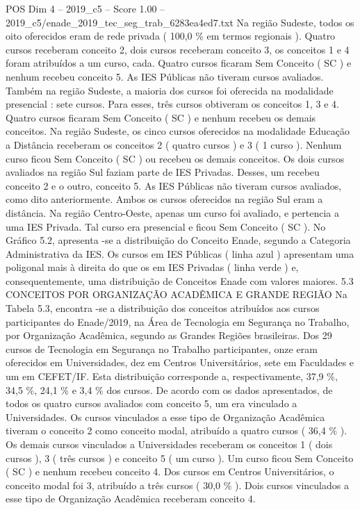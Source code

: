 \begin{textsample}{POS Dim 4 – 2019\_c5 – Score 1.00 – 2019\_c5/enade\_2019\_tec\_seg\_trab\_6283ea4ed7.txt}
Na região Sudeste, todos os oito oferecidos eram de rede privada ( 100,0 \% em termos regionais ).
Quatro cursos receberam conceito 2, dois cursos receberam conceito 3, os conceitos 1 e 4 foram atribuídos a um curso, cada.
Quatro cursos ficaram Sem Conceito ( SC ) e nenhum recebeu conceito 5.
As IES Públicas não tiveram cursos avaliados.
Também na região Sudeste, a maioria dos cursos foi oferecida na modalidade presencial : sete cursos.
Para esses, três cursos obtiveram os conceitos 1, 3 e 4.
Quatro cursos ficaram Sem Conceito ( SC ) e nenhum recebeu os demais conceitos.
Na região Sudeste, os cinco cursos oferecidos na modalidade Educação a Distância receberam os conceitos 2 ( quatro cursos ) e 3 ( 1 curso ).
Nenhum curso ficou Sem Conceito ( SC ) ou recebeu os demais conceitos.
Os dois cursos avaliados na região Sul faziam parte de IES Privadas.
Desses, um recebeu conceito 2 e o outro, conceito 5.
As IES Públicas não tiveram cursos avaliados, como dito anteriormente.
Ambos os cursos oferecidos na região Sul eram a distância.
Na região Centro-Oeste, apenas um curso foi avaliado, e pertencia a uma IES Privada.
Tal curso era presencial e ficou Sem Conceito ( SC ).
No Gráfico 5.2, apresenta -se a distribuição do Conceito Enade, segundo a Categoria Administrativa da IES.
Os cursos em IES Públicas ( linha azul ) apresentam uma poligonal mais à direita do que os em IES Privadas ( linha verde ) e, consequentemente, uma distribuição de Conceitos Enade com valores maiores. 5.3 CONCEITOS POR ORGANIZAÇÃO ACADÊMICA E GRANDE REGIÃO Na Tabela 5.3, encontra -se a distribuição dos conceitos atribuídos aos cursos participantes do Enade/2019, na Área de Tecnologia em Segurança no Trabalho, por Organização Acadêmica, segundo as Grandes Regiões brasileiras.
Dos 29 cursos de Tecnologia em Segurança no Trabalho participantes, onze eram oferecidos em Universidades, dez em Centros Universitários, sete em Faculdades e um em CEFET/IF.
Esta distribuição corresponde a, respectivamente, 37,9 \%, 34,5 \%, 24,1 \% e 3,4 \% dos cursos.
De acordo com os dados apresentados, de todos os quatro cursos avaliados com conceito 5, um era vinculado a Universidades.
Os cursos vinculados a esse tipo de Organização Acadêmica tiveram o conceito 2 como conceito modal, atribuído a quatro cursos ( 36,4 \% ).
Os demais cursos vinculados a Universidades receberam os conceitos 1 ( dois cursos ), 3 ( três cursos ) e conceito 5 ( um curso ).
Um curso ficou Sem Conceito ( SC ) e nenhum recebeu conceito 4.
Dos cursos em Centros Universitários, o conceito modal foi 3, atribuído a três cursos ( 30,0 \% ).
Dois cursos vinculados a esse tipo de Organização Acadêmica receberam conceito 4.

\end{textsample}
